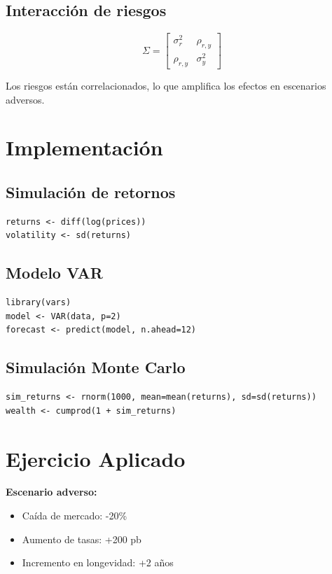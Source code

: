 \documentclass[12pt]{article}
\begin{document}
\subsection{Interacción de riesgos}

\begin{equation}
\Sigma =
\begin{bmatrix}
\sigma^2_{r} & \rho_{r,y} \\
\rho_{r,y} & \sigma^2_{y}
\end{bmatrix}
\end{equation}

Los riesgos están correlacionados, lo que amplifica los efectos en escenarios adversos.

\section{Implementación}

\subsection{Simulación de retornos}

\begin{verbatim}
returns <- diff(log(prices))
volatility <- sd(returns)
\end{verbatim}

\subsection{Modelo VAR}

\begin{verbatim}
library(vars)
model <- VAR(data, p=2)
forecast <- predict(model, n.ahead=12)
\end{verbatim}

\subsection{Simulación Monte Carlo}

\begin{verbatim}
sim_returns <- rnorm(1000, mean=mean(returns), sd=sd(returns))
wealth <- cumprod(1 + sim_returns)
\end{verbatim}

\section{Ejercicio Aplicado}

\textbf{Escenario adverso:}
\begin{itemize}
\item Caída de mercado: -20\%
\item Aumento de tasas: +200 pb
\item Incremento en longevidad: +2 años
\end{itemize}
\end{document}
